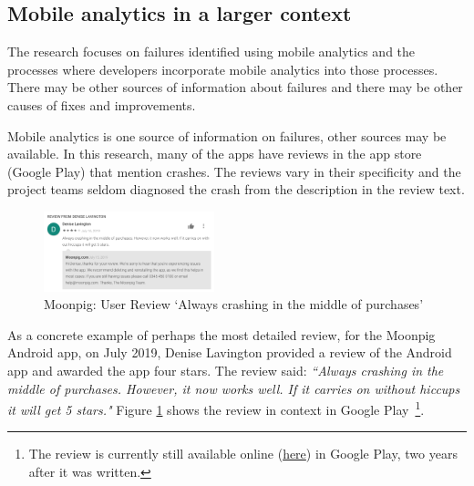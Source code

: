 \subsection{Mobile analytics in a larger context}
The research focuses on failures identified using mobile analytics and the processes where developers incorporate mobile analytics into those processes. There may be other sources of information about failures and there may be other causes of fixes and improvements.

Mobile analytics is one source of information on failures, other sources may be available. In this research, many of the apps have reviews in the app store (Google Play) that mention crashes. The reviews vary in their specificity and the project teams seldom diagnosed the crash from the description in the review text.   

\begin{figure}
    \includegraphics[width=0.44\textwidth]{images/google-play/Denise-Lavington-Review-moonpig-crashing-2019.png}
  \caption[Moonpig: User Review in Google Play `Always crashes...']{Moonpig: User Review `Always crashing in the middle of purchases'}
  \label{fig:gp-review-denise-lavington-always-crashes}
\end{figure}

As a concrete example of perhaps the most detailed review, for the Moonpig Android app, on  July 2019, Denise Lavington provided a review of the Android app and awarded the app four stars. The review said: \emph{``Always crashing in the middle of purchases. However, it now works well. If it carries on without hiccups it will get 5 stars."} Figure \ref{fig:gp-review-denise-lavington-always-crashes} shows the review in context in Google Play~\footnote{The review is currently still available online (\href{https://play.google.com/store/apps/details?id=com.commonagency.moonpig.uk&reviewId=gp\%3AAOqpTOH68VB5eWqnu7UAqcC81_rbOfWl6dzL_g48jrg0T40MPWBkMxe01KjStXZF6F57nxZxQa-AqosRKDd1xQ}{here}) in Google Play, two years after it was written.}.

